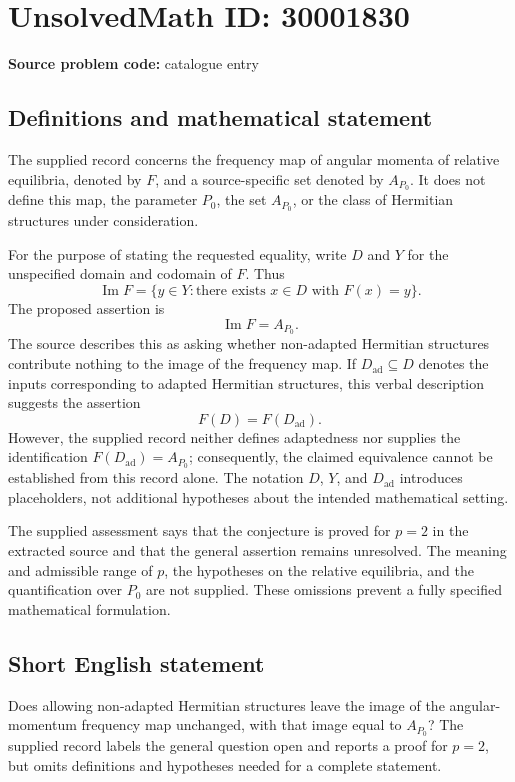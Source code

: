 \documentclass[11pt]{article}
\begin{document}
\section*{UnsolvedMath ID: 30001830}
\textbf{Source problem code:} catalogue entry
\subsection{Definitions and mathematical statement}
The supplied record concerns the frequency map of angular momenta of relative equilibria, denoted by \(F\), and a source-specific set denoted by \(A_{P_0}\). It does not define this map, the parameter \(P_0\), the set \(A_{P_0}\), or the class of Hermitian structures under consideration.

For the purpose of stating the requested equality, write \(D\) and \(Y\) for the unspecified domain and codomain of \(F\). Thus
\[
\operatorname{Im}F=\{y\in Y:\text{there exists }x\in D\text{ with }F(x)=y\}.
\]
The proposed assertion is
\[
\operatorname{Im}F=A_{P_0}.
\]
The source describes this as asking whether non-adapted Hermitian structures contribute nothing to the image of the frequency map. If \(D_{\mathrm{ad}}\subseteq D\) denotes the inputs corresponding to adapted Hermitian structures, this verbal description suggests the assertion
\[
F(D)=F(D_{\mathrm{ad}}).
\]
However, the supplied record neither defines adaptedness nor supplies the identification \(F(D_{\mathrm{ad}})=A_{P_0}\); consequently, the claimed equivalence cannot be established from this record alone. The notation \(D\), \(Y\), and \(D_{\mathrm{ad}}\) introduces placeholders, not additional hypotheses about the intended mathematical setting.

The supplied assessment says that the conjecture is proved for \(p=2\) in the extracted source and that the general assertion remains unresolved. The meaning and admissible range of \(p\), the hypotheses on the relative equilibria, and the quantification over \(P_0\) are not supplied. These omissions prevent a fully specified mathematical formulation.
\subsection{Short English statement}
Does allowing non-adapted Hermitian structures leave the image of the angular-momentum frequency map unchanged, with that image equal to \(A_{P_0}\)? The supplied record labels the general question open and reports a proof for \(p=2\), but omits definitions and hypotheses needed for a complete statement.
\end{document}
